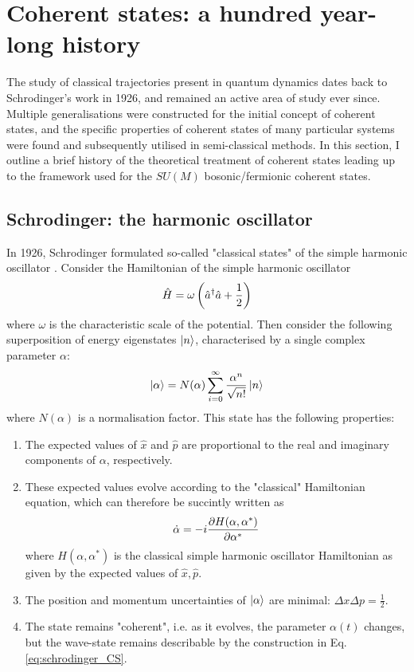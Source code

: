 \section{Coherent states: a hundred year-long history} \label{sec:history}
The study of classical trajectories present in quantum dynamics dates back to Schrodinger's work in 1926, and remained an active area of study ever since. Multiple generalisations were constructed for the initial concept of coherent states, and the specific properties of coherent states of many particular systems were found and subsequently utilised in semi-classical methods. In this section, I outline a brief history of the theoretical treatment of coherent states leading up to the framework used for the $SU(M)$ bosonic/fermionic coherent states.
	
\subsection{Schrodinger: the harmonic oscillator}
In 1926, Schrodinger formulated so-called "classical states" of the simple harmonic oscillator \cite{harmonic_classical_states}. Consider the Hamiltonian of the simple harmonic oscillator
\begin{equation}
\hat{H}=\omega \left(\hat{a}^\dagger\hat{a}+\frac{1}{2}\right)
\end{equation}
where $\omega$ is the characteristic scale of the potential. Then consider the following superposition of energy eigenstates $\ket{n}$, characterised by a single complex parameter $\alpha$:
\begin{equation} \label{eq:schrodinger_CS}
\ket{\alpha}=N(\alpha)\sum_{i=0}^\infty \frac{\alpha^n}{\sqrt{n!}}\ket{n}
\end{equation}
where $N(\alpha)$ is a normalisation factor. This state has the following properties:
\begin{enumerate}
	\item The expected values of $\hat{x}$ and $\hat{p}$ are proportional to the real and imaginary components of $\alpha$, respectively.
	\item These expected values evolve according to the "classical" Hamiltonian equation, which can therefore be succintly written as
	\begin{equation}
	\dot{\alpha}=-i\pdv{H(\alpha, \alpha^*)}{\alpha^*}
	\end{equation}
	where $H(\alpha, \alpha^*)$ is the classical simple harmonic oscillator Hamiltonian as given by the expected values of $\hat{x}, \hat{p}$.
	\item The position and momentum uncertainties of $\ket{\alpha}$ are minimal: $\Delta x\Delta p=\frac{1}{2}$.
	\item The state remains "coherent", i.e. as it evolves, the parameter $\alpha(t)$ changes, but the wave-state remains describable by the construction in Eq. \ref{eq:schrodinger_CS}.
\end{enumerate}
